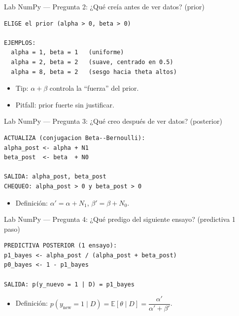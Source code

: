 \begin{frame}[fragile]{Lab NumPy — Pregunta 2: ¿Qué creía antes de ver datos? (prior)}

\begin{verbatim}
ELIGE el prior (alpha > 0, beta > 0)

EJEMPLOS:
  alpha = 1, beta = 1   (uniforme)
  alpha = 2, beta = 2   (suave, centrado en 0.5)
  alpha = 8, beta = 2   (sesgo hacia theta altos)
\end{verbatim}
\begin{itemize}
  \item Tip: \(\alpha+\beta\) controla la “fuerza” del prior.
  \item Pitfall: prior fuerte sin justificar.
\end{itemize}
\end{frame}

\begin{frame}[fragile]{Lab NumPy — Pregunta 3: ¿Qué creo después de ver datos? (posterior)}

\begin{verbatim}
ACTUALIZA (conjugacion Beta--Bernoulli):
alpha_post <- alpha + N1
beta_post  <- beta  + N0

SALIDA: alpha_post, beta_post
CHEQUEO: alpha_post > 0 y beta_post > 0
\end{verbatim}
\begin{itemize}
  \item Definición: \(\alpha'=\alpha+N_1\), \(\beta'=\beta+N_0\).
\end{itemize}
\end{frame}

\begin{frame}[fragile]{Lab NumPy — Pregunta 4: ¿Qué predigo del siguiente ensayo? (predictiva 1 paso)}

\begin{verbatim}
PREDICTIVA POSTERIOR (1 ensayo):
p1_bayes <- alpha_post / (alpha_post + beta_post)
p0_bayes <- 1 - p1_bayes

SALIDA: p(y_nuevo = 1 | D) = p1_bayes
\end{verbatim}
\begin{itemize}
  \item Definición: \(p(y_{\text{new}}=1\mid D)=\mathbb{E}[\theta\mid D]=\dfrac{\alpha'}{\alpha'+\beta'}\).
\end{itemize}
\end{frame}

